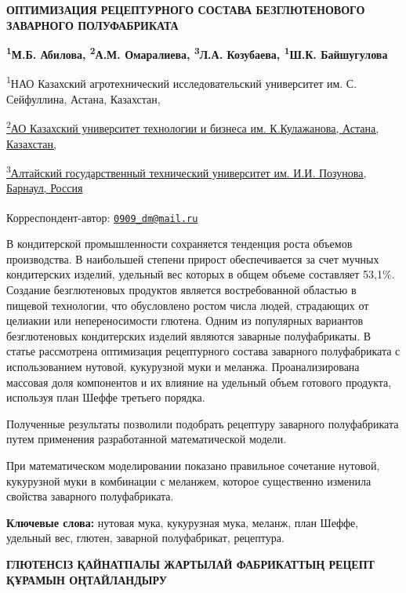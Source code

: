 
{\bfseries ОПТИМИЗАЦИЯ РЕЦЕПТУРНОГО СОСТАВА БЕЗГЛЮТЕНОВОГО ЗАВАРНОГО
ПОЛУФАБРИКАТА}

{\bfseries \textsuperscript{1}М.Б. Абилова\textsuperscript{\envelope },
\textsuperscript{2}А.М. Омаралиева, \textsuperscript{3}Л.А. Козубаева,
\textsuperscript{1}Ш.К. Байшугулова}

\textsuperscript{1}НАО Казахский агротехнический исследовательский
университет им. С. Сейфуллина, Астана,
Казахстан,\href{https://bankchart.kz/spravochniki/pochtovyye_indeksy/id/116470}{}

\href{https://bankchart.kz/spravochniki/pochtovyye_indeksy/id/116470}{\textsuperscript{2}АО
Казахский университет технологии и бизнеса им. К.Кулажанова, Астана,
Казахстан,}

\href{https://bankchart.kz/spravochniki/pochtovyye_indeksy/id/116470}{\textsuperscript{3}Алтайский
государственный технический университет им. И.И. Позунова, Барнаул,
Россия}

\textsuperscript{\envelope }Корреспондент-автор:
\href{mailto:0909_dm@mail.ru}{\nolinkurl{0909\_dm@mail.ru}}

В кондитерской промышленности сохраняется тенденция роста объемов
производства. В наибольшей степени прирост обеспечивается за счет мучных
кондитерских изделий, удельный вес которых в общем объеме составляет
53,1\%. Создание безглютеновых продуктов является востребованной
областью в пищевой технологии, что обусловлено ростом числа людей,
страдающих от целиакии или непереносимости глютена. Одним из популярных
вариантов безглютеновых кондитерских изделий являются заварные
полуфабрикаты. В статье рассмотрена оптимизация рецептурного состава
заварного полуфабриката с использованием нутовой, кукурузной муки и
меланжа. Проанализирована массовая доля компонентов и их влияние на
удельный объем готового продукта, используя план Шеффе третьего порядка.

Полученные результаты позволили подобрать рецептуру заварного
полуфабриката путем применения разработанной математической модели.

При математическом моделировании показано правильное сочетание нутовой,
кукурузной муки в комбинации с меланжем, которое существенно изменила
свойства заварного полуфабриката.

{\bfseries Ключевые слова:} нутовая мука, кукурузная мука, меланж, план
Шеффе, удельный вес, глютен, заварной полуфабрикат, рецептура.

{\bfseries ГЛЮТЕНСІЗ ҚАЙНАТПАЛЫ ЖАРТЫЛАЙ ФАБРИКАТТЫҢ РЕЦЕПТ ҚҰРАМЫН
ОҢТАЙЛАНДЫРУ}

